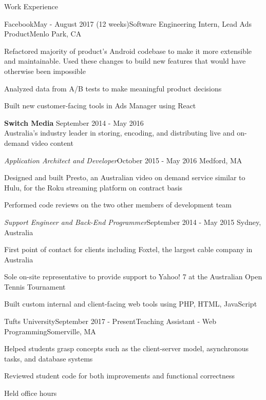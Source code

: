 \documentclass{resume}
\begin{document}
  \begin{rSection}{Work Experience}
  
  	\begin{rSubsection}{Facebook}{May - August 2017 (12 weeks)}{Software Engineering Intern, Lead Ads Product}{Menlo Park, CA}
  	\item Refactored majority of product's Android codebase to make it more extensible and maintainable. Used these changes to build new features that would have otherwise been impossible
    \item Analyzed data from A/B tests to make meaningful product decisions
    \item Built new customer-facing tools in Ads Manager using React
    \end{rSubsection}
    
    {\bf Switch Media} \hfill { September 2014 - May 2016}\\ 
    { Australia's industry leader in storing, encoding, and distributing live and on-demand video content} 

 \begin{addmargin}[2em]{0em}   
 
   \begin{rSubsection}{\normalfont\em Application Architect and Developer}{October 2015 - May 2016}{ }{\hfill Medford, MA}
    \item Designed and built Presto, an Australian video on demand service similar to Hulu, for the Roku streaming platform on contract basis
    \item Performed code reviews on the two other members of development team
    \end{rSubsection}
    
   \begin{rSubsection}{\normalfont\em Support Engineer and Back-End Programmer}{September 2014 - May 2015}{ }{Sydney, Australia}
    \item First point of contact for clients including Foxtel, the largest cable company in Australia
    \item Sole on-site representative to provide support to Yahoo! 7 at the Australian Open Tennis Tournament
    \item Built custom internal and client-facing web tools using PHP, HTML, JavaScript
    \end{rSubsection}
\end{addmargin}  

	\begin{rSubsection}{Tufts University}{September 2017 - Present}{Teaching Assistant - Web Programming}{Somerville, MA}
    \item Helped students grasp concepts such as the client-server model, asynchronous tasks, and database systems
    \item Reviewed student code for both improvements and functional correctness
    \item Held office hours
    \end{rSubsection}
  

\end{rSection}
\end{document}
